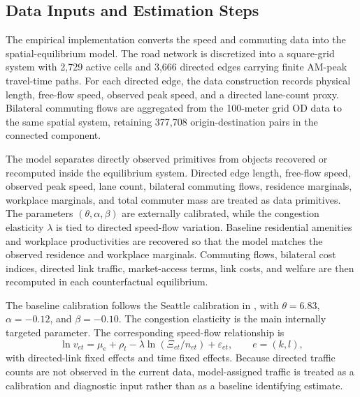 \documentclass[12pt]{article}
\begin{document}
\subsection{Data Inputs and Estimation Steps}
\label{ssec:data}

The empirical implementation converts the speed and commuting data into the spatial-equilibrium model. The road network is discretized into a square-grid system with 2,729 active cells and 3,666 directed edges carrying finite AM-peak travel-time paths. For each directed edge, the data construction records physical length, free-flow speed, observed peak speed, and a directed lane-count proxy. Bilateral commuting flows are aggregated from the 100-meter grid OD data to the same spatial system, retaining 377,708 origin-destination pairs in the connected component.

The model separates directly observed primitives from objects recovered or recomputed inside the equilibrium system. Directed edge length, free-flow speed, observed peak speed, lane count, bilateral commuting flows, residence marginals, workplace marginals, and total commuter mass are treated as data primitives. The parameters $(\theta,\alpha,\beta)$ are externally calibrated, while the congestion elasticity $\lambda$ is tied to directed speed-flow variation. Baseline residential amenities and workplace productivities are recovered so that the model matches the observed residence and workplace marginals. Commuting flows, bilateral cost indices, directed link traffic, market-access terms, link costs, and welfare are then recomputed in each counterfactual equilibrium.

The baseline calibration follows the Seattle calibration in \citet{AllenArkolakis2022}, with $\theta = 6.83$, $\alpha = -0.12$, and $\beta = -0.10$. The congestion elasticity is the main internally targeted parameter. The corresponding speed-flow relationship is
\begin{equation}
  \ln v_{et}
  =
  \mu_e+\rho_t-\lambda \ln(\Xi_{et}/n_{et})+\varepsilon_{et},
  \qquad e=(k,l),
  \label{eq:lambda_panel}
\end{equation}
with directed-link fixed effects and time fixed effects. Because directed traffic counts are not observed in the current data, model-assigned traffic is treated as a calibration and diagnostic input rather than as a baseline identifying estimate.
\end{document}
